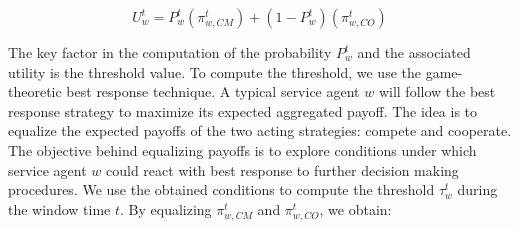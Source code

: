 \begin{equation}\label{U}
U_w^t=P_w^t(\pi_{w,CM}^t)+(1-P_w^t)(\pi_{w,CO}^t)
\end{equation}




The key factor in the computation of the probability $P_w^t$ and
the associated utility is the threshold value. To compute the
threshold, we use the game-theoretic best response technique. A
typical service agent $w$ will follow the best response strategy
to maximize its expected aggregated payoff. The idea is to
equalize the expected payoffs of the two acting strategies:
compete and cooperate.
%
%
%
The objective behind equalizing payoffs is to explore conditions
under which service agent $w$ could react with best response to
further decision making procedures. We use the obtained conditions
to compute the threshold $\tau_w^t$ during the window time $t$. By
equalizing $\pi_{w,CM}^t$ and $\pi_{w,CO}^t$, we obtain:

